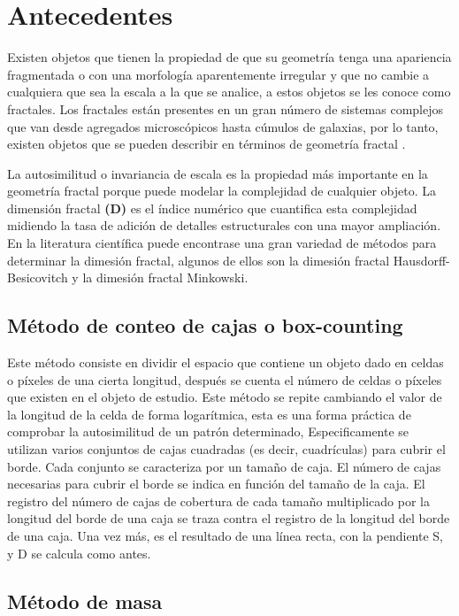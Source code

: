 \documentclass[11pt]{article}
\begin{document}
\section{Antecedentes}



Existen objetos que tienen la propiedad de que su geometría tenga una apariencia fragmentada o con una morfología aparentemente irregular y que no cambie a cualquiera que sea la escala a la que se analice, a estos objetos se les conoce como fractales. Los fractales están presentes en un gran número de sistemas complejos que van desde agregados microscópicos hasta cúmulos de galaxias, por lo tanto, existen objetos que se pueden describir en términos de geometría fractal \cite{Vicsek1992}. 

La autosimilitud o invariancia de escala es la propiedad más importante en la geometría fractal porque puede modelar la complejidad de cualquier objeto. La dimensión fractal \textbf{(D)} es el índice numérico que cuantifica esta complejidad midiendo la tasa de adición de detalles estructurales con una mayor ampliación. En la literatura científica puede encontrase una gran variedad de métodos para determinar la dimesión fractal, algunos de ellos son la dimesión fractal Hausdorff-Besicovitch y la dimesión fractal Minkowski.

\subsection{Método de conteo de cajas o box-counting}

Este método consiste en dividir el espacio que contiene un objeto dado en celdas o píxeles de una cierta longitud, después se cuenta el número de celdas o píxeles que existen en el objeto de estudio. Este método se repite cambiando el valor de la longitud de la celda de forma logarítmica, esta es una forma práctica de comprobar la autosimilitud de un patrón determinado, Especificamente se utilizan  varios conjuntos de cajas cuadradas (es decir, cuadrículas) para cubrir el borde. Cada conjunto se caracteriza por un tamaño de caja. El número de cajas necesarias para cubrir el borde se indica en función del tamaño de la caja. El registro del número de cajas de cobertura de cada tamaño multiplicado por la longitud del borde de una caja se traza contra el registro de la longitud del borde de una caja. Una vez más, es el resultado de una línea recta, con la pendiente S, y D se calcula como antes.

\subsection{Método de masa}
\end{document}
